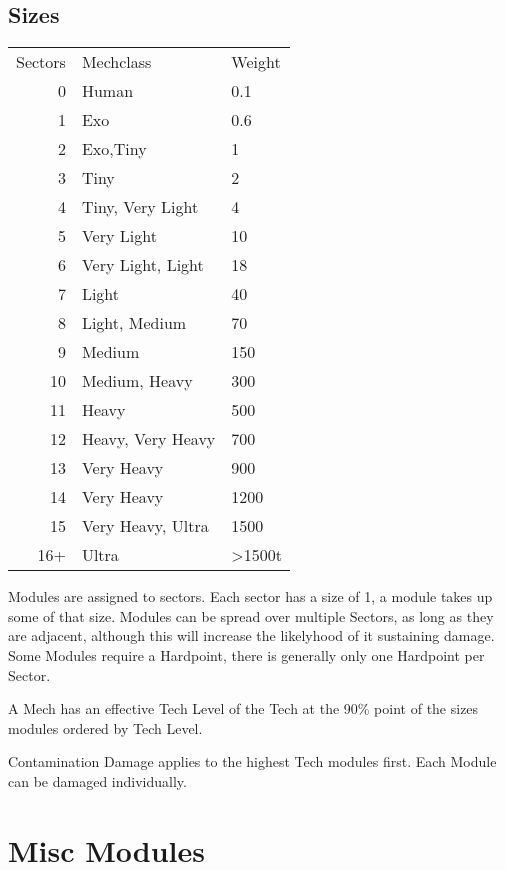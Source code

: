 
\subsection{Sizes}\label{subsec:sizes}

\begin{tabular}{r|ll}
    Sectors & Mechclass & Weight\\
    0 &Human & 0.1\\
    1 &Exo& 0.6\\
    2 &Exo,Tiny& 1\\
    3 &Tiny & 2\\
    4 &Tiny, Very Light & 4\\
    5 &Very Light& 10\\
    6 &Very Light, Light& 18\\
    7 &Light& 40\\
    8 &Light, Medium& 70\\
    9 &Medium& 150\\
    10 &Medium, Heavy& 300\\
    11 &Heavy& 500\\
    12 &Heavy, Very Heavy& 700\\
    13 &Very Heavy& 900\\
    14 &Very Heavy& 1200\\
    15 &Very Heavy, Ultra& 1500\\
    16+ &Ultra& >1500t\\
\end{tabular}\par
Modules are assigned to sectors.
Each sector has a size of 1, a module takes up some of that size.
Modules can be spread over multiple Sectors, as long as they are adjacent, although this will increase the likelyhood
of it sustaining damage.
Some Modules require a Hardpoint, there is generally only one Hardpoint per Sector.\par
A Mech has an effective Tech Level of the Tech at the 90\% point of the sizes modules ordered by Tech Level.\par
Contamination Damage applies to the highest Tech modules first.
Each Module can be damaged individually.\par



\section{Misc Modules}\label{sec:miscmodules}
\par
